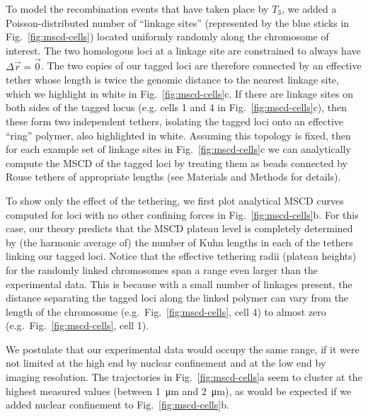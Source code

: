 \documentclass[9pt,twocolumn,twoside,lineno]{pnas-new}
\begin{document}
To model the recombination events that have taken place by $T_3$, we added a Poisson-distributed number of ``linkage sites'' (represented by the blue sticks in Fig.~\ref{fig:mscd-cells}) located uniformly randomly along the chromosome of interest.
The two homologous loci at a linkage site are constrained to always have $\Delta{}\vec{r} = \vec{0}$.
The two copies of our tagged loci are therefore connected by an effective tether whose length is twice the genomic distance to the nearest linkage site, which we highlight in white in Fig.~\ref{fig:mscd-cells}c.
If there are linkage sites on both sides of the tagged locus (e.g. cells 1 and 4 in Fig.~\ref{fig:mscd-cells}c), then these form two independent tethers, isolating the tagged loci onto an effective ``ring'' polymer, also highlighted in white.
Assuming this topology is fixed, then for each example set of linkage sites in Fig.~\ref{fig:mscd-cells}c we can analytically compute the MSCD of the tagged loci by treating them as beads connected by Rouse tethers of appropriate lengths (see Materials and Methods for details).

To show only the effect of the tethering, we first plot analytical MSCD curves computed for loci with no other confining forces in Fig.~\ref{fig:mscd-cells}b. For this case, our theory predicts that the MSCD plateau level is completely determined by (the harmonic average of) the number of Kuhn lengths in each of the tethers linking our tagged loci.
Notice that the effective tethering radii (plateau heights) for the randomly linked chromosomes span a range even larger than the experimental data.
This is because with a small number of linkages present, the distance separating the tagged loci along the linked polymer can vary from the length of the chromosome (e.g.\ Fig.~\ref{fig:mscd-cells}, cell 4) to almost zero (e.g.\ Fig.~\ref{fig:mscd-cells}, cell 1).

We postulate that our experimental data would occupy the same range, if it were not limited at the high end by nuclear confinement and at the low end by imaging resolution. The trajectories in Fig.~\ref{fig:mscd-cells}a seem to cluster at the highest measured values (between \SI{1}{\micro\meter} and \SI{2}{\micro\meter}), as would be expected if we added nuclear confinement to Fig.~\ref{fig:mscd-cells}b.
\end{document}
